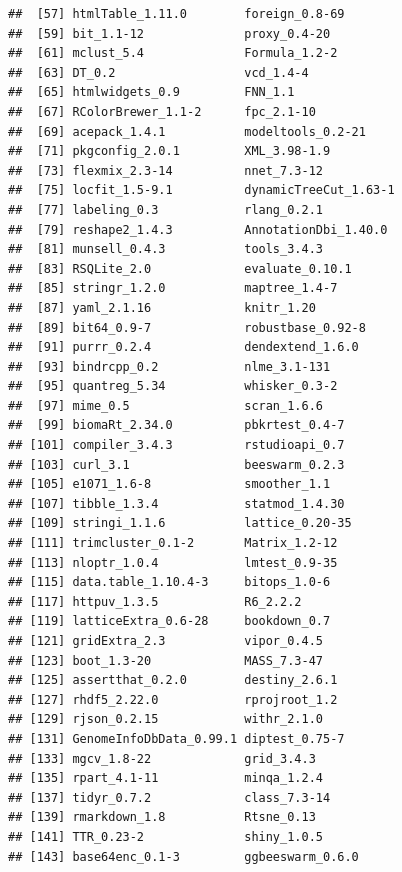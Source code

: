 \documentclass[]{book}
\theoremstyle{definition}
\theoremstyle{definition}
\theoremstyle{definition}
\theoremstyle{remark}
\begin{document}
\begin{verbatim}
##  [57] htmlTable_1.11.0        foreign_0.8-69         
##  [59] bit_1.1-12              proxy_0.4-20           
##  [61] mclust_5.4              Formula_1.2-2          
##  [63] DT_0.2                  vcd_1.4-4              
##  [65] htmlwidgets_0.9         FNN_1.1                
##  [67] RColorBrewer_1.1-2      fpc_2.1-10             
##  [69] acepack_1.4.1           modeltools_0.2-21      
##  [71] pkgconfig_2.0.1         XML_3.98-1.9           
##  [73] flexmix_2.3-14          nnet_7.3-12            
##  [75] locfit_1.5-9.1          dynamicTreeCut_1.63-1  
##  [77] labeling_0.3            rlang_0.2.1            
##  [79] reshape2_1.4.3          AnnotationDbi_1.40.0   
##  [81] munsell_0.4.3           tools_3.4.3            
##  [83] RSQLite_2.0             evaluate_0.10.1        
##  [85] stringr_1.2.0           maptree_1.4-7          
##  [87] yaml_2.1.16             knitr_1.20             
##  [89] bit64_0.9-7             robustbase_0.92-8      
##  [91] purrr_0.2.4             dendextend_1.6.0       
##  [93] bindrcpp_0.2            nlme_3.1-131           
##  [95] quantreg_5.34           whisker_0.3-2          
##  [97] mime_0.5                scran_1.6.6            
##  [99] biomaRt_2.34.0          pbkrtest_0.4-7         
## [101] compiler_3.4.3          rstudioapi_0.7         
## [103] curl_3.1                beeswarm_0.2.3         
## [105] e1071_1.6-8             smoother_1.1           
## [107] tibble_1.3.4            statmod_1.4.30         
## [109] stringi_1.1.6           lattice_0.20-35        
## [111] trimcluster_0.1-2       Matrix_1.2-12          
## [113] nloptr_1.0.4            lmtest_0.9-35          
## [115] data.table_1.10.4-3     bitops_1.0-6           
## [117] httpuv_1.3.5            R6_2.2.2               
## [119] latticeExtra_0.6-28     bookdown_0.7           
## [121] gridExtra_2.3           vipor_0.4.5            
## [123] boot_1.3-20             MASS_7.3-47            
## [125] assertthat_0.2.0        destiny_2.6.1          
## [127] rhdf5_2.22.0            rprojroot_1.2          
## [129] rjson_0.2.15            withr_2.1.0            
## [131] GenomeInfoDbData_0.99.1 diptest_0.75-7         
## [133] mgcv_1.8-22             grid_3.4.3             
## [135] rpart_4.1-11            minqa_1.2.4            
## [137] tidyr_0.7.2             class_7.3-14           
## [139] rmarkdown_1.8           Rtsne_0.13             
## [141] TTR_0.23-2              shiny_1.0.5            
## [143] base64enc_0.1-3         ggbeeswarm_0.6.0
\end{verbatim}


\end{document}
